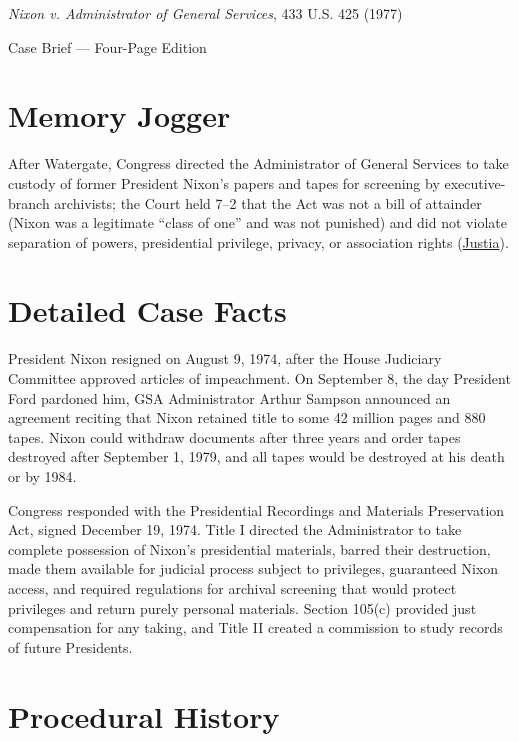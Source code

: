 \documentclass[12pt]{article}
\begin{document}
\begin{center}
{\LARGE \textit{Nixon v. Administrator of General Services}, 433 U.S. 425 (1977)\par}
\vspace{0.8em}
{\large Case Brief --- Four-Page Edition\par}
\end{center}
\vspace{1em}

\section{Memory Jogger}

After Watergate, Congress directed the Administrator of General Services to take custody of former President Nixon's papers and tapes for screening by executive-branch archivists; the Court held 7--2 that the Act was not a bill of attainder (Nixon was a legitimate ``class of one'' and was not punished) and did not violate separation of powers, presidential privilege, privacy, or association rights (\href{https://supreme.justia.com/cases/federal/us/433/425/}{Justia}).

\section{Detailed Case Facts}

President Nixon resigned on August 9, 1974, after the House Judiciary Committee approved articles of impeachment. On September 8, the day President Ford pardoned him, GSA Administrator Arthur Sampson announced an agreement reciting that Nixon retained title to some 42 million pages and 880 tapes. Nixon could withdraw documents after three years and order tapes destroyed after September 1, 1979, and all tapes would be destroyed at his death or by 1984.

Congress responded with the Presidential Recordings and Materials Preservation Act, signed December 19, 1974. Title I directed the Administrator to take complete possession of Nixon's presidential materials, barred their destruction, made them available for judicial process subject to privileges, guaranteed Nixon access, and required regulations for archival screening that would protect privileges and return purely personal materials. Section 105(c) provided just compensation for any taking, and Title II created a commission to study records of future Presidents.

\section{Procedural History}
\end{document}
